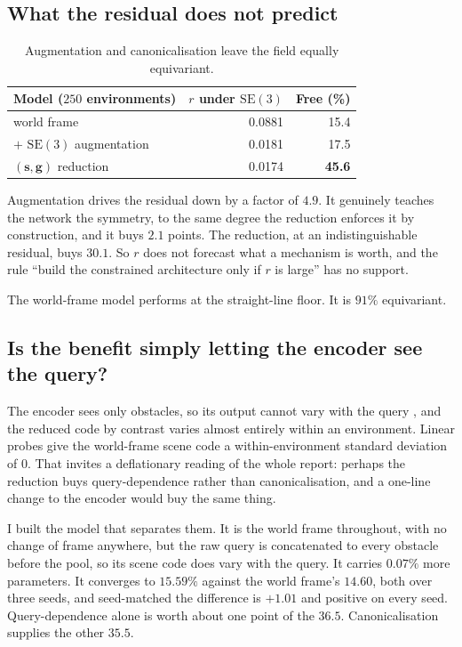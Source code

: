 \documentclass[11pt,a4paper]{article}
\newcommand{\toprule}{\hline}
\newcommand{\midrule}{\hline}
\newcommand{\bottomrule}{\hline}
\newcommand{\svec}{\mathbf{s}}
\newcommand{\gvec}{\mathbf{g}}
\newcommand{\SE}{\mathrm{SE}(3)}
\begin{document}
\subsection{What the residual does not predict}
\label{sec:twosigns}

\begin{table}[t]
\centering\small
\begin{tabular}{lrr}
\toprule
Model ($250$ environments) & $r$ under $\SE$ & Free (\%) \\
\midrule
world frame                  & 0.0881 & 15.4 \\
\quad $+$ $\SE$ augmentation & 0.0181 & 17.5 \\
$(\svec,\gvec)$ reduction    & 0.0174 & \textbf{45.6} \\
\bottomrule
\end{tabular}
\caption{Augmentation and canonicalisation leave the field equally equivariant.}
\label{tab:twosigns}
\end{table}

Augmentation drives the residual down by a factor of $4.9$. It genuinely teaches
the network the symmetry, to the same degree the reduction enforces it by
construction, and it buys $2.1$ points. The reduction, at an indistinguishable
residual, buys $30.1$. So $r$ does not forecast what a mechanism is worth, and
the rule ``build the constrained architecture only if $r$ is large'' has no
support.

The world-frame model performs at the straight-line floor. It is $91\%$
equivariant.

\subsection{Is the benefit simply letting the encoder see the query?}

The encoder sees only obstacles, so its output cannot
vary with the query , and the reduced code by contrast varies almost entirely
within an environment. Linear probes give the world-frame scene code a within-environment standard
deviation of $0$.  That invites a deflationary reading of the whole report:
perhaps the reduction buys query-dependence rather than canonicalisation, and a
one-line change to the encoder would buy the same thing.

I built the model that separates them. It is the world frame throughout, with no
change of frame anywhere, but the raw query is concatenated to every obstacle
before the pool, so its scene code does vary with the query. It carries $0.07\%$
more parameters. It converges to $15.59\%$ against the world frame's
$14.60$, both over three seeds, and seed-matched the difference is
$+1.01$ and positive on every seed. Query-dependence alone is worth about one
point of the $36.5$. Canonicalisation supplies the other $35.5$.
\end{document}
